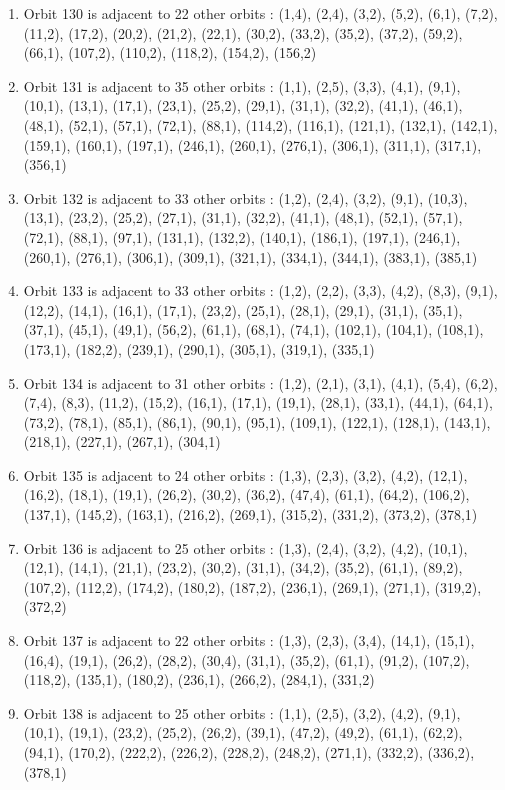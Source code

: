 \documentclass[12pt]{article}
\begin{document}
\begin{enumerate}
\item Orbit 130 is adjacent to 22 other orbits : (1,4), (2,4), (3,2), (5,2), (6,1), (7,2), (11,2), (17,2), (20,2), (21,2), (22,1), (30,2), (33,2), (35,2), (37,2), (59,2), (66,1), (107,2), (110,2), (118,2), (154,2), (156,2)
\item Orbit 131 is adjacent to 35 other orbits : (1,1), (2,5), (3,3), (4,1), (9,1), (10,1), (13,1), (17,1), (23,1), (25,2), (29,1), (31,1), (32,2), (41,1), (46,1), (48,1), (52,1), (57,1), (72,1), (88,1), (114,2), (116,1), (121,1), (132,1), (142,1), (159,1), (160,1), (197,1), (246,1), (260,1), (276,1), (306,1), (311,1), (317,1), (356,1)
\item Orbit 132 is adjacent to 33 other orbits : (1,2), (2,4), (3,2), (9,1), (10,3), (13,1), (23,2), (25,2), (27,1), (31,1), (32,2), (41,1), (48,1), (52,1), (57,1), (72,1), (88,1), (97,1), (131,1), (132,2), (140,1), (186,1), (197,1), (246,1), (260,1), (276,1), (306,1), (309,1), (321,1), (334,1), (344,1), (383,1), (385,1)
\item Orbit 133 is adjacent to 33 other orbits : (1,2), (2,2), (3,3), (4,2), (8,3), (9,1), (12,2), (14,1), (16,1), (17,1), (23,2), (25,1), (28,1), (29,1), (31,1), (35,1), (37,1), (45,1), (49,1), (56,2), (61,1), (68,1), (74,1), (102,1), (104,1), (108,1), (173,1), (182,2), (239,1), (290,1), (305,1), (319,1), (335,1)
\item Orbit 134 is adjacent to 31 other orbits : (1,2), (2,1), (3,1), (4,1), (5,4), (6,2), (7,4), (8,3), (11,2), (15,2), (16,1), (17,1), (19,1), (28,1), (33,1), (44,1), (64,1), (73,2), (78,1), (85,1), (86,1), (90,1), (95,1), (109,1), (122,1), (128,1), (143,1), (218,1), (227,1), (267,1), (304,1)
\item Orbit 135 is adjacent to 24 other orbits : (1,3), (2,3), (3,2), (4,2), (12,1), (16,2), (18,1), (19,1), (26,2), (30,2), (36,2), (47,4), (61,1), (64,2), (106,2), (137,1), (145,2), (163,1), (216,2), (269,1), (315,2), (331,2), (373,2), (378,1)
\item Orbit 136 is adjacent to 25 other orbits : (1,3), (2,4), (3,2), (4,2), (10,1), (12,1), (14,1), (21,1), (23,2), (30,2), (31,1), (34,2), (35,2), (61,1), (89,2), (107,2), (112,2), (174,2), (180,2), (187,2), (236,1), (269,1), (271,1), (319,2), (372,2)
\item Orbit 137 is adjacent to 22 other orbits : (1,3), (2,3), (3,4), (14,1), (15,1), (16,4), (19,1), (26,2), (28,2), (30,4), (31,1), (35,2), (61,1), (91,2), (107,2), (118,2), (135,1), (180,2), (236,1), (266,2), (284,1), (331,2)
\item Orbit 138 is adjacent to 25 other orbits : (1,1), (2,5), (3,2), (4,2), (9,1), (10,1), (19,1), (23,2), (25,2), (26,2), (39,1), (47,2), (49,2), (61,1), (62,2), (94,1), (170,2), (222,2), (226,2), (228,2), (248,2), (271,1), (332,2), (336,2), (378,1)

\end{enumerate}
\end{document}
